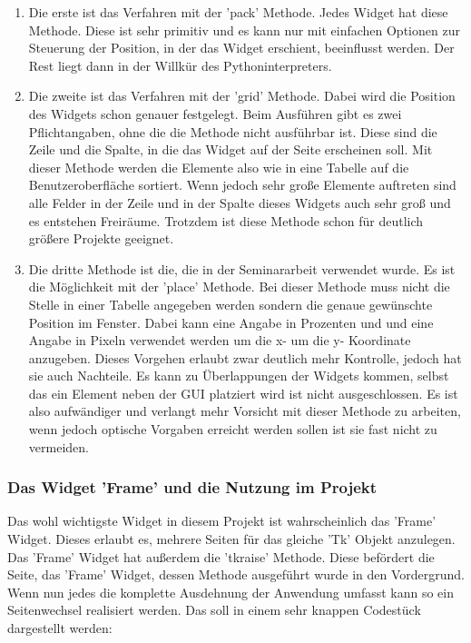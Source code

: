 \documentclass[11pt]{scrartcl}
\begin{document}
\begin{onehalfspace}
\begin{enumerate}
\item Die erste ist das Verfahren mit der 'pack' Methode. Jedes Widget hat diese Methode. Diese ist sehr primitiv und es kann nur mit einfachen Optionen zur Steuerung der Position, in der das Widget erschient, beeinflusst werden. Der Rest liegt dann in der Willkür des Pythoninterpreters.
\item Die zweite ist  das Verfahren mit der 'grid' Methode. Dabei wird die Position des Widgets schon genauer festgelegt. Beim Ausführen gibt es zwei Pflichtangaben, ohne die die Methode nicht ausführbar ist. Diese sind die Zeile und die Spalte, in die das Widget auf der Seite erscheinen soll. Mit dieser Methode werden die Elemente also wie in eine Tabelle auf die Benutzeroberfläche sortiert. Wenn jedoch sehr große Elemente auftreten sind alle Felder in der Zeile und in der Spalte dieses Widgets auch sehr groß und es entstehen Freiräume. Trotzdem ist diese Methode schon für deutlich größere Projekte geeignet.
\item Die dritte Methode ist die, die in der Seminararbeit verwendet wurde. Es ist die Möglichkeit mit der 'place' Methode. Bei dieser Methode muss nicht die Stelle in einer Tabelle angegeben werden sondern die genaue gewünschte Position im Fenster. Dabei kann eine Angabe in Prozenten und und eine Angabe in Pixeln verwendet werden um die x- um die y- Koordinate anzugeben. Dieses Vorgehen erlaubt zwar deutlich mehr Kontrolle, jedoch hat sie auch Nachteile. Es kann zu Überlappungen der Widgets kommen, selbst das ein Element neben der GUI platziert wird ist nicht ausgeschlossen. Es ist also aufwändiger und verlangt mehr Vorsicht mit dieser Methode zu arbeiten, wenn jedoch optische Vorgaben erreicht werden sollen ist sie fast nicht zu vermeiden.
\end{enumerate}




\subsubsection{Das Widget 'Frame' und die Nutzung im Projekt}
Das wohl wichtigste Widget in diesem Projekt ist wahrscheinlich das 'Frame' Widget. Dieses erlaubt es, mehrere Seiten für das gleiche 'Tk' Objekt anzulegen. Das 'Frame' Widget hat außerdem die 'tkraise' Methode. Diese befördert die Seite, das 'Frame' Widget, dessen Methode ausgeführt wurde in den Vordergrund. Wenn nun jedes die komplette Ausdehnung der Anwendung umfasst kann so ein Seitenwechsel realisiert werden. Das soll in einem sehr knappen Codestück dargestellt werden:


\end{onehalfspace}
\end{document}

